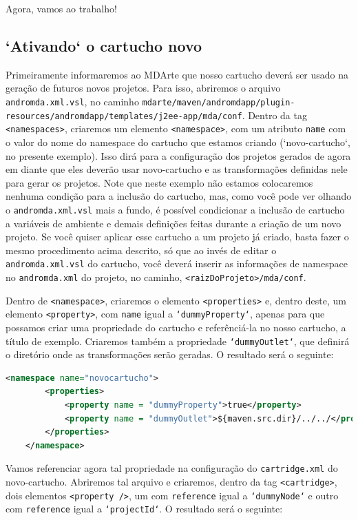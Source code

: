 Agora, vamos ao trabalho!

\subsection{`Ativando` o cartucho novo}
Primeiramente informaremos ao MDArte que nosso cartucho deverá ser usado na
geração de futuros novos projetos. Para isso, abriremos o arquivo
\texttt{andromda.xml.vsl}, no caminho
\texttt{mdarte/maven/andromdapp/plugin-resources/andromdapp/templates/j2ee-app/mda/conf}.
Dentro da tag \texttt{<namespaces>}, criaremos um elemento \texttt{<namespace>},
com um atributo \texttt{name} com o valor do nome do namespace do cartucho que
estamos criando (`novo-cartucho`, no presente exemplo). Isso dirá para a
configuração dos projetos gerados de agora em diante que eles deverão usar
novo-cartucho e as transformações definidas nele para gerar os projetos. Note
que neste exemplo não estamos colocaremos nenhuma condição para a inclusão do
cartucho, mas, como você pode ver olhando o \texttt{andromda.xml.vsl} mais a
fundo, é possível condicionar a inclusão de cartucho a variáveis de ambiente e
demais definições feitas durante a criação de um novo projeto. Se você quiser
aplicar esse cartucho a um projeto já criado, basta fazer o mesmo procedimento
acima descrito, só que ao invés de editar o \texttt{andromda.xml.vsl} do
cartucho, você deverá inserir as informações de namespace no
\texttt{andromda.xml} do projeto, no caminho, \texttt{<raizDoProjeto>/mda/conf}.

Dentro de \texttt{<namespace>}, criaremos o elemento \texttt{<properties>} e,
dentro deste, um elemento \texttt{<property>}, com \texttt{name} igual a
\texttt{`dummyProperty`}, apenas para que possamos criar uma propriedade do
cartucho e referênciá-la no nosso cartucho, a título de exemplo. Criaremos
também a propriedade \texttt{`dummyOutlet`}, que definirá o diretório onde as
transformações serão geradas. O resultado será o seguinte:

 \begin{lstlisting}[language=xml]
	<namespace name="novocartucho">
	    <properties>
	        <property name = "dummyProperty">true</property>
	        <property name = "dummyOutlet">${maven.src.dir}/../../</property>
	    </properties>
	</namespace>
 \end{lstlisting}
 
 Vamos referenciar agora tal propriedade na configuração do
 \texttt{cartridge.xml} do novo-cartucho. Abriremos tal arquivo e criaremos,
 dentro da tag \texttt{<cartridge>}, dois elementos \texttt{<property />}, um
 com \texttt{reference} igual a \texttt{`dummyNode`} e outro com
 \texttt{reference} igual a \texttt{`projectId`}. O resultado será o seguinte:
 
